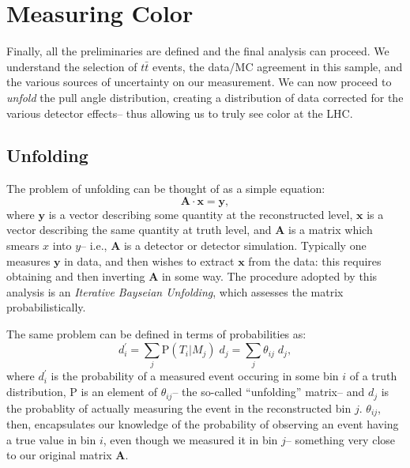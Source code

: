 \FloatBarrier

\section{Measuring Color}

Finally, all the preliminaries are defined and the final analysis can proceed. We understand the selection of $t\bar{t}$ events, the data/MC agreement in this sample, and the various sources of uncertainty on our measurement. We can now proceed to \textit{unfold} the pull angle distribution, creating a distribution of data corrected for the various detector effects-- thus allowing us to truly see color at the LHC.

	\subsection{Unfolding}

	The problem of unfolding can be thought of as a simple equation:
	\begin{equation}
	\mathbf{A} \cdot \mathbf{x} = \mathbf{y},
	\end{equation}
	where $\mathbf{y}$ is a vector describing some quantity at the reconstructed level, $\mathbf{x}$ is a vector describing the same quantity at truth level, and $\mathbf{A}$ is a matrix which smears $x$ into $y$-- i.e., $\mathbf{A}$ is a detector or detector simulation. Typically one measures $\mathbf{y}$ in data, and then wishes to extract $\mathbf{x}$ from the data: this requires obtaining and then inverting $\mathbf{A}$ in some way. The procedure adopted by this analysis is an \textit{Iterative Bayseian Unfolding}, which assesses the matrix probabilistically. 

	The same problem can be defined in terms of probabilities as:
%
\begin{equation}
  d^\prime_i = \sum_j\mathrm{P}(T_i|M_j)\;d_j  = \sum_{j}\theta_{ij}\;d_j,
\end{equation}
%
	where $d^\prime_i$ is the probability of a measured event occuring in some bin $i$ of a truth distribution, $\mathrm{P}$ is an element of $\theta_{ij}$-- the so-called ``unfolding'' matrix-- and $d_j$ is the probablity of actually measuring the event in the reconstructed bin $j$. $\theta_{ij}$, then, encapsulates our knowledge of the probability of observing an event having a true value in bin $i$, even though we measured it in bin $j$-- something very close to our original matrix $\mathbf{A}$.

